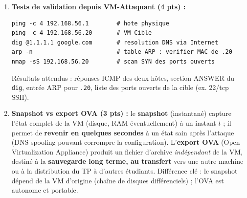 \documentclass[11pt]{article}
\begin{document}
\begin{corrige}
\begin{enumerate}
\begin{lstlisting}
# VM-Attaquant
nmcli con mod "Wired connection 2" ipv4.method manual \
  ipv4.addresses 192.168.56.10/24 ipv4.gateway "" ipv4.dns "1.1.1.1"
nmcli con up "Wired connection 2"
# VM-Cible
nmcli con mod "Wired connection 2" ipv4.method manual \
  ipv4.addresses 192.168.56.20/24 ipv4.gateway "" ipv4.dns "1.1.1.1"
nmcli con up "Wired connection 2"
\end{lstlisting}
    \textbf{Vigilance :} la passerelle par défaut doit rester sur la carte \textbf{NAT} (10.0.2.2), pas sur la carte Host-Only, sinon Internet est perdu (le réseau Host-Only n'a pas de routeur vers l'extérieur).
    \item \textbf{Tests de validation depuis VM-Attaquant (4 pts) :}
\begin{lstlisting}
ping -c 4 192.168.56.1        # hote physique
ping -c 4 192.168.56.20       # VM-Cible
dig @1.1.1.1 google.com       # resolution DNS via Internet
arp -n                        # table ARP : verifier MAC de .20
nmap -sS 192.168.56.20        # scan SYN des ports ouverts
\end{lstlisting}
    Résultats attendus : réponses ICMP des deux hôtes, section ANSWER du \texttt{dig}, entrée ARP pour \texttt{.20}, liste des ports ouverts de la cible (ex. 22/tcp SSH).
    \item \textbf{Snapshot vs export OVA (3 pts) :} le \textbf{snapshot} (instantané) capture l'état complet de la VM (disque, RAM éventuellement) à un instant $t$ ; il permet de \textbf{revenir en quelques secondes} à un état sain après l'attaque (DNS spoofing pouvant corrompre la configuration). L'\textbf{export OVA} (Open Virtualization Appliance) produit un fichier d'archive \emph{indépendant} de la VM, destiné à la \textbf{sauvegarde long terme, au transfert} vers une autre machine ou à la distribution du TP à d'autres étudiants. Différence clé : le snapshot dépend de la VM d'origine (chaîne de disques différenciels) ; l'OVA est autonome et portable.
\end{enumerate}
\end{corrige}
\end{document}
